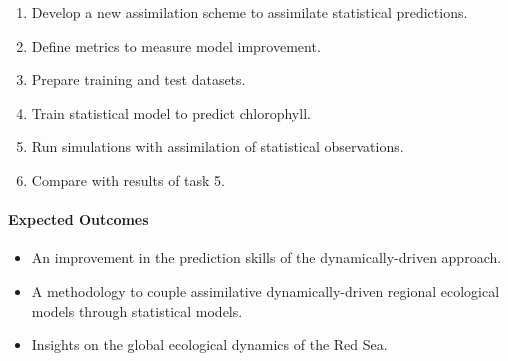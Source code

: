 \begin{enumerate}

\item Develop a new assimilation scheme to assimilate statistical predictions.

\item Define metrics to measure model improvement.

\item Prepare training and test datasets.

\item Train statistical model to predict chlorophyll.

\item Run simulations with assimilation of statistical observations.

\item Compare with results of task 5.

\end{enumerate}

\paragraph{Expected Outcomes}

\begin{itemize}

\item An improvement in the prediction skills of the dynamically-driven
approach.

\item A methodology to couple assimilative dynamically-driven regional
ecological models through statistical models.

\item Insights on the global ecological dynamics of the Red Sea.

\end{itemize}
